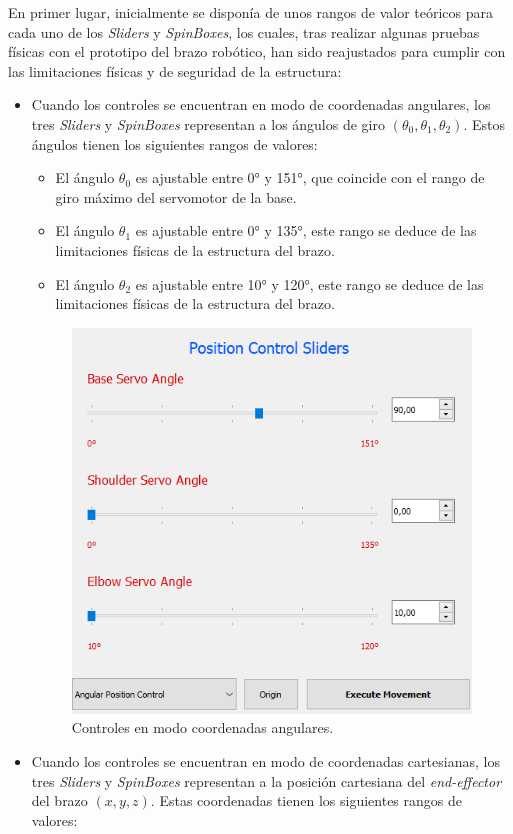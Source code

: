 En primer lugar, inicialmente se disponía de unos rangos de valor teóricos para cada uno de los \textit{Sliders} y \textit{SpinBoxes}, los cuales, tras realizar algunas pruebas físicas con el prototipo del brazo robótico, han sido reajustados para cumplir con las limitaciones físicas y de seguridad de la estructura:
    \begin{itemize}
        \item Cuando los controles se encuentran en modo de coordenadas angulares, los tres \textit{Sliders} y \textit{SpinBoxes} representan a los ángulos de giro $(\theta_{0}, \theta_{1}, \theta_{2})$. Estos ángulos tienen los siguientes rangos de valores:
        \begin{itemize}
            \item El ángulo $\theta_{0}$ es ajustable entre 0° y 151°, que coincide con el rango de giro máximo del servomotor de la base.
            \item El ángulo $\theta_{1}$ es ajustable entre 0° y 135°, este rango se deduce de las limitaciones físicas de la estructura del brazo.
            \item El ángulo $\theta_{2}$ es ajustable entre 10° y 120°, este rango se deduce de las limitaciones físicas de la estructura del brazo.
        \end{itemize}
        \begin{figure}[H]
            \centering
            \includegraphics[width=0.55\linewidth]{pictures/Joints_Gui.PNG}
            \caption{Controles en modo coordenadas angulares.}
            \label{fig:ui_joint}
         \end{figure}
        \item Cuando los controles se encuentran en modo de coordenadas cartesianas, los tres \textit{Sliders} y \textit{SpinBoxes} representan a la posición cartesiana del \textit{end-effector} del brazo $(x, y, z)$. Estas coordenadas tienen los siguientes rangos de valores:

\end{itemize}
